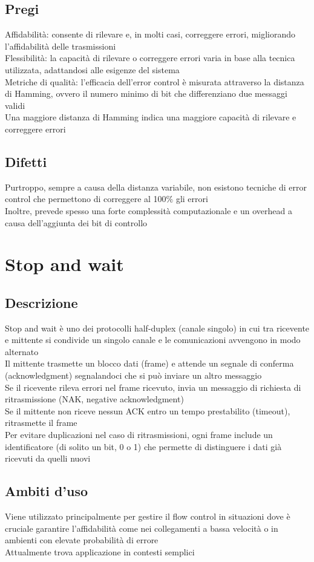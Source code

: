 \documentclass[10pt,oneside,a4paper]{article}
\begin{document}
\subsection{Pregi}
Affidabilità: consente di rilevare e, in molti casi, correggere errori, migliorando l'affidabilità delle trasmissioni\\
Flessibilità: la capacità di rilevare o correggere errori varia in base alla tecnica utilizzata, adattandosi alle esigenze del sistema\\
Metriche di qualità: l'efficacia dell'error control è misurata attraverso la distanza di Hamming, ovvero il numero minimo di bit che differenziano due messaggi validi\\
Una maggiore distanza di Hamming indica una maggiore capacità di rilevare e correggere errori
\subsection{Difetti}
Purtroppo, sempre a causa della distanza variabile, non esistono tecniche di error control che permettono di correggere al 100$\%$ gli errori\\
Inoltre, prevede spesso una forte complessità computazionale e un overhead a causa dell'aggiunta dei bit di controllo
\section{Stop and wait}
\subsection{Descrizione}
Stop and wait è uno dei protocolli half-duplex (canale singolo) in cui tra ricevente e mittente si condivide un singolo canale e le comunicazioni avvengono in modo alternato\\
Il mittente trasmette un blocco dati (frame) e attende un segnale di conferma (acknowledgment) segnalandoci che si può inviare un altro messaggio\\
Se il ricevente rileva errori nel frame ricevuto, invia un messaggio di richiesta di ritrasmissione (NAK, negative acknowledgment)\\
Se il mittente non riceve nessun ACK entro un tempo prestabilito (timeout), ritrasmette il frame\\
Per evitare duplicazioni nel caso di ritrasmissioni, ogni frame include un identificatore (di solito un bit, 0 o 1) che permette di distinguere i dati già ricevuti da quelli nuovi
\subsection{Ambiti d'uso}
Viene utilizzato principalmente per gestire il flow control in situazioni dove è cruciale garantire l'affidabilità come nei collegamenti a bassa velocità o in ambienti con elevate probabilità di errore\\
Attualmente trova applicazione in contesti semplici
\end{document}

